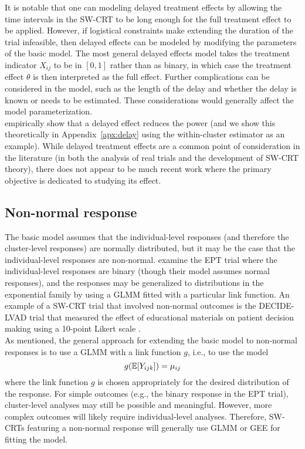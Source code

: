 \documentclass[10pt]{article}
\begin{document}
It is notable that one can modeling delayed treatment effects by allowing the time intervals in the SW-CRT to be long enough for the full treatment effect to be applied. However, if logistical constraints make extending the duration of the trial infeasible, then delayed effects can be modeled by modifying the parameters of the basic model. The most general delayed effects model takes the treatment indicator $X_{ij}$ to be in $[0,1]$ rather than as binary, in which case the treatment effect $\theta$ is then interpreted as the full effect. Further complications can be considered in the model, such as the length of the delay and whether the delay is known or needs to be estimated. These considerations would generally affect the model parameterization.
\\

\textcite{Hussey:2007} empirically show that a delayed effect reduces the power (and we show this theoretically in Appendix~\ref{apx:delay} using the within-cluster estimator as an example). While delayed treatment effects are a common point of consideration in the literature (in both the analysis of real trials and the development of SW-CRT theory), there does not appear to be much recent work where the primary objective is dedicated to studying its effect.

\subsection{Non-normal response}

The basic model assumes that the individual-level responses (and therefore the cluster-level responses) are normally distributed, but it may be the case that the individual-level responses are non-normal. \citeauthor{Hussey:2007} examine the EPT trial where the individual-level responses are binary (though their model assumes normal responses), and the responses may be generalized to distributions in the exponential family by using a GLMM fitted with a particular link function. An example of a SW-CRT trial that involved non-normal outcomes is the DECIDE-LVAD trial that measured the effect of educational materials on patient decision making using a 10-point Likert scale \parencite{Allen:2018}.
\\

As mentioned, the general approach for extending the basic model to non-normal responses is to use a GLMM with a link function $g$, i.e., to use the model
\[
g(\mathbb{E}[Y_{ijk}]) = \mu_{ij}
\]
where the link function $g$ is chosen appropriately for the desired distribution of the response. For simple outcomes (e.g., the binary response in the EPT trial), cluster-level analyses may still be possible and meaningful. However, more complex outcomes will likely require individual-level analyses. Therefore, SW-CRTs featuring a non-normal response will generally use GLMM or GEE for fitting the model.
\\
\end{document}
